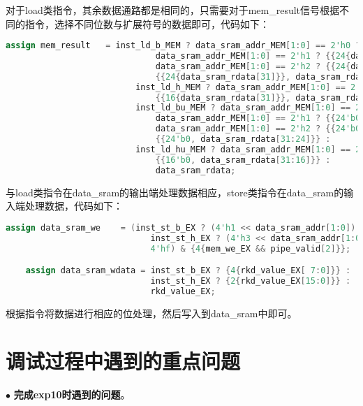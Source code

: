 \documentclass[11pt]{article}
\begin{document}
对于load类指令，其余数据通路都是相同的，只需要对于mem_result信号根据不同的指令，选择不同位数与扩展符号的数据即可，代码如下：
\begin{lstlisting}[language=Verilog]
    assign mem_result   = inst_ld_b_MEM ? data_sram_addr_MEM[1:0] == 2'h0 ? {{24{data_sram_rdata[ 7]}}, data_sram_rdata[ 7: 0]} :
                              data_sram_addr_MEM[1:0] == 2'h1 ? {{24{data_sram_rdata[15]}}, data_sram_rdata[15: 8]} :
                              data_sram_addr_MEM[1:0] == 2'h2 ? {{24{data_sram_rdata[23]}}, data_sram_rdata[23:16]} :
                              {{24{data_sram_rdata[31]}}, data_sram_rdata[31:24]} :
                          inst_ld_h_MEM ? data_sram_addr_MEM[1:0] == 2'h0 ? {{16{data_sram_rdata[15]}}, data_sram_rdata[15: 0]} :
                              {{16{data_sram_rdata[31]}}, data_sram_rdata[31:16]} :
                          inst_ld_bu_MEM ? data_sram_addr_MEM[1:0] == 2'h0 ? {{24'b0, data_sram_rdata[ 7: 0]}} :
                              data_sram_addr_MEM[1:0] == 2'h1 ? {{24'b0, data_sram_rdata[15: 8]}} :
                              data_sram_addr_MEM[1:0] == 2'h2 ? {{24'b0, data_sram_rdata[23:16]}} :
                              {{24'b0, data_sram_rdata[31:24]}} :
                          inst_ld_hu_MEM ? data_sram_addr_MEM[1:0] == 2'h0 ? {{16'b0, data_sram_rdata[15: 0]}} :
                              {{16'b0, data_sram_rdata[31:16]}} :
                              data_sram_rdata;
\end{lstlisting}

与load类指令在data\_sram的输出端处理数据相应，store类指令在data\_sram的输入端处理数据，代码如下：
\begin{lstlisting}[language=Verilog]
    assign data_sram_we    = (inst_st_b_EX ? (4'h1 << data_sram_addr[1:0]) :
                             inst_st_h_EX ? (4'h3 << data_sram_addr[1:0]) :
                             4'hf) & {4{mem_we_EX && pipe_valid[2]}};

    assign data_sram_wdata = inst_st_b_EX ? {4{rkd_value_EX[ 7:0]}} :
                             inst_st_h_EX ? {2{rkd_value_EX[15:0]}} :
                             rkd_value_EX;
\end{lstlisting}
根据指令将数据进行相应的位处理，然后写入到data\_sram中即可。

\section{调试过程中遇到的重点问题}

\noindent
$\bullet$
\textbf{完成exp10时遇到的问题}。
\end{document}
